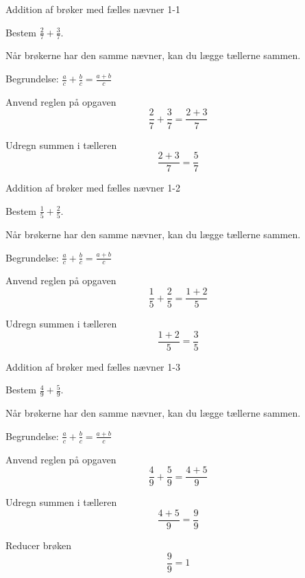 \documentclass{article}
\begin{document}

\tableofcontents
\newpage

\begin{exercise}{Addition af brøker med fælles nævner 1-1}

Bestem $\frac{2}{7} + \frac{3}{7}$.


\hint

Når brøkerne har den samme nævner, kan du lægge tællerne sammen.

\hint

Begrundelse: $\frac{a}{c} + \frac{b}{c} = \frac{a + b}{c}$

\hint

Anvend reglen på opgaven
\[
\frac{2}{7} + \frac{3}{7} = \frac{2 + 3}{7}
\]

\hint

Udregn summen i tælleren
\[
\frac{2 + 3}{7} = \frac{5}{7}
\]

\end{exercise}

\newpage

\begin{exercise}{Addition af brøker med fælles nævner 1-2}

Bestem $\frac{1}{5} + \frac{2}{5}$.


\hint

Når brøkerne har den samme nævner, kan du lægge tællerne sammen.

\hint

Begrundelse: $\frac{a}{c} + \frac{b}{c} = \frac{a + b}{c}$

\hint

Anvend reglen på opgaven
\[
\frac{1}{5} + \frac{2}{5} = \frac{1 + 2}{5}
\]

\hint

Udregn summen i tælleren
\[
\frac{1 + 2}{5} = \frac{3}{5}
\]

\end{exercise}

\newpage

\begin{exercise}{Addition af brøker med fælles nævner 1-3}

Bestem $\frac{4}{9} + \frac{5}{9}$.


\hint

Når brøkerne har den samme nævner, kan du lægge tællerne sammen.

\hint

Begrundelse: $\frac{a}{c} + \frac{b}{c} = \frac{a + b}{c}$

\hint

Anvend reglen på opgaven
\[
\frac{4}{9} + \frac{5}{9} = \frac{4 + 5}{9}
\]

\hint

Udregn summen i tælleren
\[
\frac{4 + 5}{9} = \frac{9}{9}
\]

\hint

Reducer brøken
\[
\frac{9}{9} = 1
\]

\end{exercise}
\end{document}
